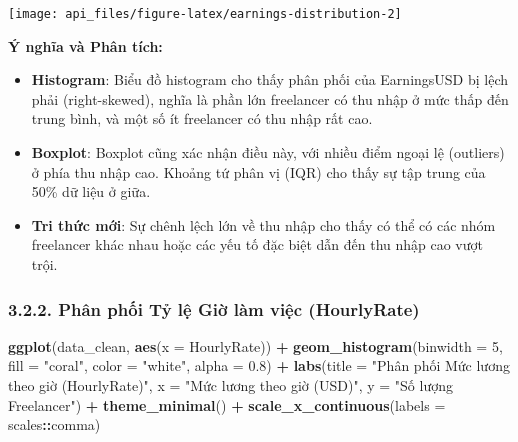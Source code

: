 \documentclass[
]{article}
\newenvironment{Shaded}{\begin{snugshade}}{\end{snugshade}}
\newcommand{\AttributeTok}[1]{\textcolor[rgb]{0.13,0.29,0.53}{#1}}
\newcommand{\DecValTok}[1]{\textcolor[rgb]{0.00,0.00,0.81}{#1}}
\newcommand{\FloatTok}[1]{\textcolor[rgb]{0.00,0.00,0.81}{#1}}
\newcommand{\FunctionTok}[1]{\textcolor[rgb]{0.13,0.29,0.53}{\textbf{#1}}}
\newcommand{\NormalTok}[1]{#1}
\newcommand{\SpecialCharTok}[1]{\textcolor[rgb]{0.81,0.36,0.00}{\textbf{#1}}}
\newcommand{\StringTok}[1]{\textcolor[rgb]{0.31,0.60,0.02}{#1}}
\begin{document}
\begin{center}\texttt{[image: api\_files/figure-latex/earnings-distribution-2]} \end{center}

\textbf{Ý nghĩa và Phân tích:}

\begin{itemize}
\item
  \textbf{Histogram}: Biểu đồ histogram cho thấy phân phối của
  EarningsUSD bị lệch phải (right-skewed), nghĩa là phần lớn freelancer
  có thu nhập ở mức thấp đến trung bình, và một số ít freelancer có thu
  nhập rất cao.
\item
  \textbf{Boxplot}: Boxplot cũng xác nhận điều này, với nhiều điểm ngoại
  lệ (outliers) ở phía thu nhập cao. Khoảng tứ phân vị (IQR) cho thấy sự
  tập trung của 50\% dữ liệu ở giữa.
\item
  \textbf{Tri thức mới}: Sự chênh lệch lớn về thu nhập cho thấy có thể
  có các nhóm freelancer khác nhau hoặc các yếu tố đặc biệt dẫn đến thu
  nhập cao vượt trội.
\end{itemize}

\subsubsection{3.2.2. Phân phối Tỷ lệ Giờ làm việc
(HourlyRate)}\label{phuxe2n-phux1ed1i-tux1ef7-lux1ec7-giux1edd-luxe0m-viux1ec7c-hourlyrate}

\begin{Shaded}
\begin{Highlighting}[]
\FunctionTok{ggplot}\NormalTok{(data\_clean, }\FunctionTok{aes}\NormalTok{(}\AttributeTok{x =}\NormalTok{ HourlyRate)) }\SpecialCharTok{+}
  \FunctionTok{geom\_histogram}\NormalTok{(}\AttributeTok{binwidth =} \DecValTok{5}\NormalTok{, }\AttributeTok{fill =} \StringTok{"coral"}\NormalTok{, }\AttributeTok{color =} \StringTok{"white"}\NormalTok{, }\AttributeTok{alpha =} \FloatTok{0.8}\NormalTok{) }\SpecialCharTok{+}
  \FunctionTok{labs}\NormalTok{(}\AttributeTok{title =} \StringTok{"Phân phối Mức lương theo giờ (HourlyRate)"}\NormalTok{,}
       \AttributeTok{x =} \StringTok{"Mức lương theo giờ (USD)"}\NormalTok{,}
       \AttributeTok{y =} \StringTok{"Số lượng Freelancer"}\NormalTok{) }\SpecialCharTok{+}
  \FunctionTok{theme\_minimal}\NormalTok{() }\SpecialCharTok{+}
  \FunctionTok{scale\_x\_continuous}\NormalTok{(}\AttributeTok{labels =}\NormalTok{ scales}\SpecialCharTok{::}\NormalTok{comma)}
\end{Highlighting}
\end{Shaded}
\end{document}
